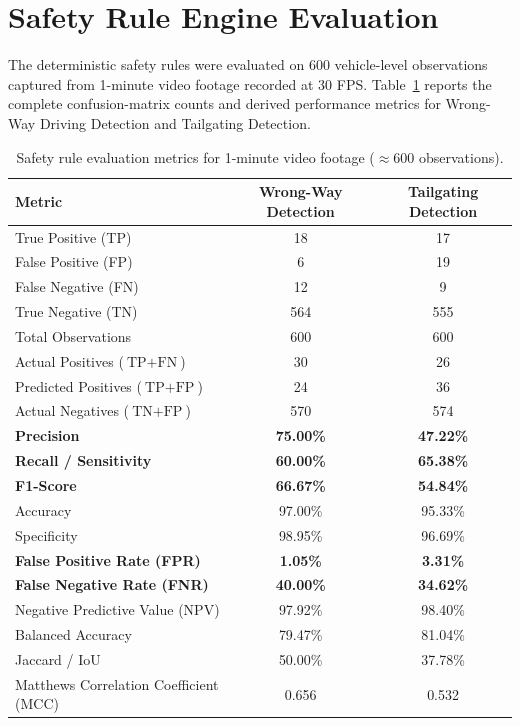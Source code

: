 \section{Safety Rule Engine Evaluation}

The deterministic safety rules were evaluated on 600 vehicle-level observations captured from 1-minute video footage recorded at 30 FPS. Table~\ref{tab:safety_rule_full_eval} reports the complete confusion-matrix counts and derived performance metrics for Wrong-Way Driving Detection and Tailgating Detection.

\begin{table}[H]
\centering
\caption{Safety rule evaluation metrics for 1-minute video footage ($\approx 600$ observations).}
\label{tab:safety_rule_full_eval}
\begin{tabular}{lcc}
\toprule
\textbf{Metric} & \textbf{Wrong-Way Detection} & \textbf{Tailgating Detection} \\
\midrule
True Positive (TP) & 18 & 17 \\
False Positive (FP) & 6 & 19 \\
False Negative (FN) & 12 & 9 \\
True Negative (TN) & 564 & 555 \\
\midrule
Total Observations & 600 & 600 \\
Actual Positives ($\text{TP}+\text{FN}$) & 30 & 26 \\
Predicted Positives ($\text{TP}+\text{FP}$) & 24 & 36 \\
Actual Negatives ($\text{TN}+\text{FP}$) & 570 & 574 \\
\midrule
\textbf{Precision} & \textbf{75.00\%} & \textbf{47.22\%} \\
\textbf{Recall / Sensitivity} & \textbf{60.00\%} & \textbf{65.38\%} \\
\textbf{F1-Score} & \textbf{66.67\%} & \textbf{54.84\%} \\
Accuracy & 97.00\% & 95.33\% \\
Specificity & 98.95\% & 96.69\% \\
\textbf{False Positive Rate (FPR)} & \textbf{1.05\%} & \textbf{3.31\%} \\
\textbf{False Negative Rate (FNR)} & \textbf{40.00\%} & \textbf{34.62\%} \\
Negative Predictive Value (NPV) & 97.92\% & 98.40\% \\
Balanced Accuracy & 79.47\% & 81.04\% \\
Jaccard / IoU & 50.00\% & 37.78\% \\
Matthews Correlation Coefficient (MCC) & 0.656 & 0.532 \\
\bottomrule
\end{tabular}
\end{table}

